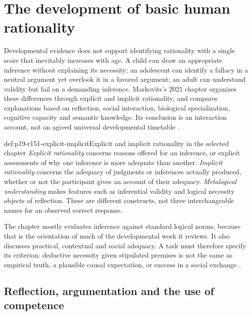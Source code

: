 \chapter{The development of basic human rationality}
\label{sec:p19-rationality-15-1}

Developmental evidence does not support identifying rationality with a single
score that inevitably increases with age. A child can draw an appropriate
inference without explaining its necessity; an adolescent can identify a
fallacy in a neutral argument yet overlook it in a favored argument; an adult
can understand validity but fail on a demanding inference. Markovits's 2021
chapter organizes these differences through explicit and implicit rationality,
and compares explanations based on reflection, social interaction, biological
specialization, cognitive capacity and semantic knowledge. Its conclusion is
an interaction account, not an agreed universal developmental timetable
\cite[pp.~779--787]{Markovits2021DevelopmentRationality}.

\begin{hbdefinition}{def:p19-r151-explicit-implicit}{Explicit and implicit rationality in the selected chapter}
\emph{Explicit rationality} concerns reasons offered for an inference, or
explicit assessments of why one inference is more adequate than another.
\emph{Implicit rationality} concerns the adequacy of judgments or inferences
actually produced, whether or not the participant gives an account of their
adequacy. \emph{Metalogical understanding} makes features such as inferential
validity and logical necessity objects of reflection. These are different
constructs, not three interchangeable names for an observed correct response.

The chapter mostly evaluates inference against standard logical norms,
because that is the orientation of much of the developmental work it reviews.
It also discusses practical, contextual and social adequacy. A task must
therefore specify its criterion: deductive necessity given stipulated premises
is not the same as empirical truth, a plausible causal expectation, or success
in a social exchange \cite[p.~779]{Markovits2021DevelopmentRationality}.
\end{hbdefinition}

\section{Reflection, argumentation and the use of competence}
\label{sec:p19-r151-explicit}

